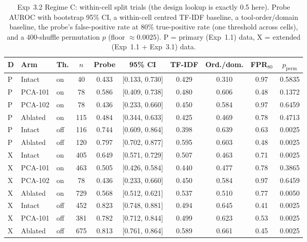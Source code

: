\begin{table}[t]
\centering
\scriptsize
\setlength{\tabcolsep}{4pt}
\caption{Exp~3.2 Regime C: within-cell split trials (the design lookup is exactly 0.5 here). Probe AUROC with bootstrap 95\% CI, a within-cell centred TF-IDF baseline, a tool-order/domain baseline, the probe's false-positive rate at 80\% true-positive rate (one threshold across cells), and a 400-shuffle permutation $p$ (floor $\approx0.0025$). P = primary (Exp~1.1) data, X = extended (Exp~1.1 + Exp~3.1) data.}
\label{tab:exp32c}
\begin{tabular}{lllccccccc}
\toprule
D & Arm & Th. & $n$ & Probe & 95\% CI & TF-IDF & Ord./dom. & FPR$_{80}$ & $p_{\mathrm{perm}}$ \\
\midrule
P & Intact & on & 40 & 0.433 & [0.133, 0.730] & 0.429 & 0.310 & 0.97 & 0.5835 \\
P & PCA-101 & on & 78 & 0.586 & [0.409, 0.738] & 0.480 & 0.606 & 0.48 & 0.1372 \\
P & PCA-102 & on & 78 & 0.436 & [0.233, 0.660] & 0.450 & 0.584 & 0.97 & 0.6459 \\
P & Ablated & on & 115 & 0.484 & [0.344, 0.633] & 0.425 & 0.469 & 0.78 & 0.4713 \\
P & Intact & off & 116 & 0.744 & [0.609, 0.864] & 0.398 & 0.639 & 0.63 & 0.0025 \\
P & Ablated & off & 120 & 0.797 & [0.702, 0.877] & 0.595 & 0.603 & 0.48 & 0.0025 \\
X & Intact & on & 405 & 0.649 & [0.571, 0.729] & 0.507 & 0.463 & 0.71 & 0.0025 \\
X & PCA-101 & on & 463 & 0.505 & [0.426, 0.584] & 0.440 & 0.477 & 0.78 & 0.3865 \\
X & PCA-102 & on & 78 & 0.436 & [0.233, 0.660] & 0.450 & 0.584 & 0.97 & 0.6459 \\
X & Ablated & on & 729 & 0.568 & [0.512, 0.621] & 0.537 & 0.510 & 0.77 & 0.0050 \\
X & Intact & off & 452 & 0.823 & [0.748, 0.881] & 0.494 & 0.645 & 0.41 & 0.0025 \\
X & PCA-101 & off & 381 & 0.782 & [0.712, 0.844] & 0.499 & 0.623 & 0.53 & 0.0025 \\
X & Ablated & off & 675 & 0.813 & [0.761, 0.864] & 0.589 & 0.661 & 0.45 & 0.0025 \\
\bottomrule
\end{tabular}
\end{table}
